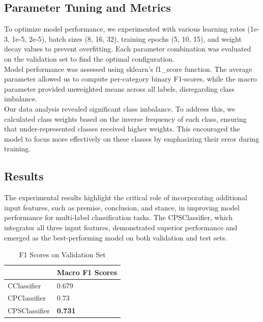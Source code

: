 \documentclass[11pt]{article}
\begin{document}
\subsection{Parameter Tuning and Metrics}
To optimize model performance, we experimented with various learning rates (1e-3, 1e-5, 2e-5), batch sizes (8, 16, 32), training epochs (5, 10, 15), and weight decay values to prevent overfitting. Each parameter combination was evaluated on the validation set to find the optimal configuration.
\\Model performance was assessed using sklearn's f1\_score function. The average parameter allowed us to compute per-category binary F1-scores, while the macro parameter provided unweighted means across all labels, disregarding class imbalance.
\\Our data analysis revealed significant class imbalance. To address this, we calculated class weights based on the inverse frequency of each class, ensuring that under-represented classes received higher weights. This encouraged the model to focus more effectively on these classes by emphasizing their error during training.
\subsection{Results}
The experimental results highlight the critical role of incorporating additional input features, such as premise, conclusion, and stance, in improving model performance for multi-label classification tasks. The CPSClassifier, which integrates all three input features, demonstrated superior performance and emerged as the best-performing model on both validation and test sets.

\begin{table}[H]
\centering
\captionsetup{justification=centering, singlelinecheck=false}
\caption{F1 Scores on Validation Set}
\footnotesize
\begin{tabular}{|l|l|}
\hline
                                             & Macro F1 Scores \\ \hline
CClassifier                     & 0.679                  \\ \hline
CPClassifier                           & 0.73                   \\ \hline
CPSClassifier                     & \textbf{0.731}                  \\ \hline

\end{tabular}
\label{Tab:Tcr_1}
\end{table}
\end{document}
